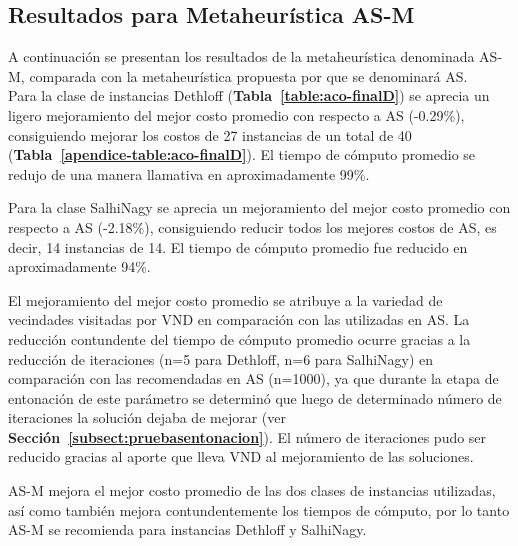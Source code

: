 \subsection{Resultados para Metaheurística AS-M}

A continuación se presentan los resultados de la metaheurística denominada AS-M, comparada con la metaheurística propuesta por \cite{maco} que se denominará AS.\\

Para la clase de instancias Dethloff (\textbf{Tabla~\ref{table:aco-finalD}}) se aprecia un ligero mejoramiento del mejor costo  promedio con respecto a AS (-0.29\%), consiguiendo mejorar los costos de 27 instancias de un total de 40 (\textbf{Tabla~\ref{apendice-table:aco-finalD}}). El tiempo de cómputo promedio se redujo de una manera llamativa en aproximadamente   99\%.

Para la clase SalhiNagy se aprecia un mejoramiento del mejor costo promedio con respecto a AS (-2.18\%), consiguiendo reducir todos los mejores costos de AS, es decir, 14 instancias de 14. El tiempo de cómputo promedio fue reducido en aproximadamente 94\%.

El mejoramiento del mejor costo promedio se atribuye a la variedad de vecindades visitadas por VND en comparación con las utilizadas en AS. La reducción contundente del tiempo de cómputo promedio ocurre gracias a la reducción de  iteraciones (n=5 para Dethloff, n=6 para SalhiNagy) en comparación con las recomendadas en AS (n=1000), ya que durante la etapa de entonación de este parámetro se determinó que luego de determinado número de iteraciones la solución dejaba de mejorar (ver \textbf{Sección~\ref{subsect:pruebasentonacion}}). El número de iteraciones pudo ser reducido gracias al aporte que lleva VND al  mejoramiento de las soluciones.

AS-M mejora el mejor costo promedio de las dos clases de instancias utilizadas, así como también mejora contundentemente los tiempos de cómputo, por lo tanto AS-M se recomienda para instancias Dethloff y SalhiNagy.


%

